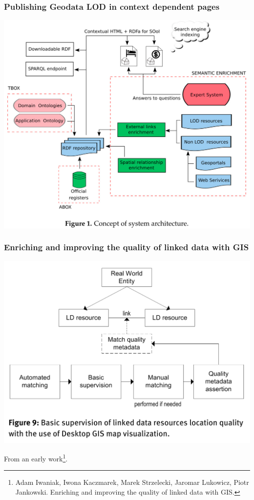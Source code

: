 \documentclass[10pt]{beamer}
\begin{document}
\begin{frame}
  \frametitle{Publishing Geodata LOD in context dependent pages}
  \centering
  \includegraphics[width=0.8\linewidth]{integrating-tech.png}
\end{frame}

\begin{frame}
  \frametitle{Enriching and improving the quality of linked data
with GIS}
  \begin{center}
   \includegraphics[width=0.7\linewidth]{deducing-rels.png}
 \end{center}
 From an early work\footnote{Adam Iwaniak, Iwona Kaczmarek, Marek Strzelecki, Jaromar Lukowicz, Piotr Jankowski. Enriching and improving the quality of linked data with GIS. }.
\end{frame}
\end{document}

